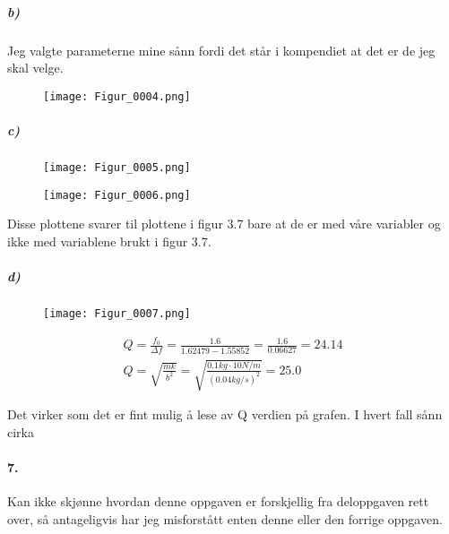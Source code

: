 \documentclass[11pt, A4paper,norsk]{article}
\begin{document}
			\subparagraph{b)}
				\begin{flushleft}
Jeg valgte parameterne mine sånn fordi det står i kompendiet at det er de jeg skal velge.
				\end{flushleft}
				\begin{figure}[H]
\texttt{[image: Figur\_0004.png]}
				\end{figure}









			\subparagraph{c)} \hspace{1mm}
				\begin{figure}[H]
\texttt{[image: Figur\_0005.png]}
				\end{figure}
				\begin{figure}[H]
\texttt{[image: Figur\_0006.png]}
				\end{figure}
				\begin{flushleft}
Disse plottene svarer til plottene i figur 3.7 bare at de er med våre variabler og ikke med variablene brukt i figur 3.7.
				\end{flushleft}









			\subparagraph{d)} \hspace{1mm}
				\begin{figure}[H]
\texttt{[image: Figur\_0007.png]}
				\end{figure}
				\begin{gather*}
Q = \frac{f_0}{\Delta f} = \frac{1.6}{1.62479 - 1.55852} = \frac{1.6}{0.06627} = 24.14 \\
Q = \sqrt{\frac{m k}{b^2}} = \sqrt{\frac{0.1 kg \cdot 10 N/m}{(0.04 kg/s)^2}} = 25.0
				\end{gather*}
				\begin{flushleft}
Det virker som det er fint mulig å lese av Q verdien på grafen. I hvert fall sånn cirka
				\end{flushleft}






		\paragraph{7.}
			\begin{flushleft}
Kan ikke skjønne hvordan denne oppgaven er forskjellig fra deloppgaven rett over, så antageligvis har jeg misforstått enten denne eller den forrige oppgaven.
			\end{flushleft}
\end{document}
